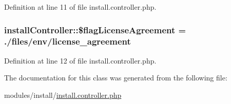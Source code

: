 Definition at line 11 of file install.\+controller.\+php.

\hypertarget{classinstallController_af1f7a5fe91be6a576cdffcc07cba5be8}{}
\subsubsection[{\$flag\+License\+Agreement}]{\setlength{\rightskip}{0pt plus 5cm}install\+Controller\+::\$flag\+License\+Agreement = \textquotesingle{}./files/env/license\+\_\+agreement\textquotesingle{}}\label{classinstallController_af1f7a5fe91be6a576cdffcc07cba5be8}


Definition at line 12 of file install.\+controller.\+php.



The documentation for this class was generated from the following file\+:\begin{DoxyCompactItemize}
\item 
modules/install/\hyperlink{install_8controller_8php}{install.\+controller.\+php}\end{DoxyCompactItemize}
